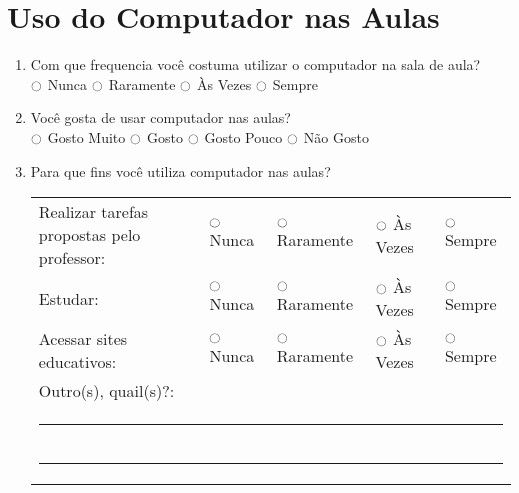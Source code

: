 \section{Uso do Computador nas Aulas}
\begin{enumerate}
\item Com que frequencia você costuma utilizar o computador na sala de aula? \\
$\ocircle$ Nunca  $\ocircle$ Raramente  $\ocircle$ Às Vezes  $\ocircle$ Sempre \\

\item Você gosta de usar computador nas aulas? \\
$\ocircle$ Gosto Muito $\ocircle$ Gosto $\ocircle$ Gosto Pouco $\ocircle$ Não Gosto

\item Para que fins você utiliza computador nas aulas? \\
\begin{tabular}{lllll}
	Realizar tarefas propostas pelo professor: & $\ocircle$ Nunca & $\ocircle$ Raramente & $\ocircle$ Às Vezes & $\ocircle$ Sempre \\
	Estudar: & $\ocircle$ Nunca & $\ocircle$ Raramente & $\ocircle$ Às Vezes & $\ocircle$ Sempre \\
	Acessar sites educativos: & $\ocircle$ Nunca & $\ocircle$ Raramente & $\ocircle$ Às Vezes & $\ocircle$ Sempre \\
	Outro(s), quail(s)?: \\
	\multicolumn{5}{l}{\noindent\rule{\textwidth}{0.4pt}} \\
	\multicolumn{5}{l}{\noindent\rule{\textwidth}{0.4pt}} \\
\end{tabular}

\end{enumerate}

